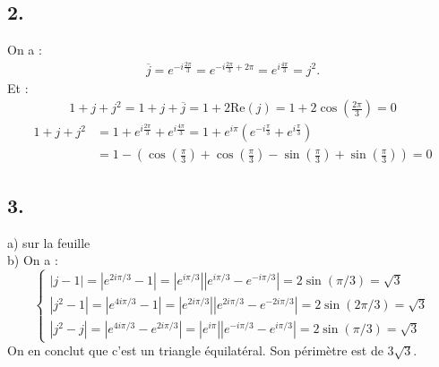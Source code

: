 \documentclass[10pt]{article}
\begin{document}
\subsection*{2.}
\begin{tcolorbox}[enhanced, width=7in, center, size=fbox, fontupper=\large, drop shadow southwest]
    On a :
    \begin{align*}
        \overline{j}=e^{-i\frac{2\pi}{3}}=e^{-i\frac{2\pi}{3}+2\pi}=e^{i\frac{4\pi}{3}}=j^2.
    \end{align*}
    Et :
    \begin{align*}
        1 + j + j^2 = 1 + j + \overline{j} = 1 + 2\text{Re}(j)=1+2\cos(\frac{2\pi}{3})=0
    \end{align*}
    \begin{align*}
        1 + j + j^2 &= 1 + e^{i\frac{2\pi}{3}} + e^{i\frac{4\pi}{3}}=1 + e^{i\pi}\left(e^{-i\frac{\pi}{3}} + e^{i\frac{\pi}{3}} \right)\\
        &= 1 - (\cos\left(\frac{\pi}{3}\right) + \cos\left(\frac{\pi}{3}\right) - \sin\left(\frac{\pi}{3}\right) + \sin\left(\frac{\pi}{3}\right))=0
    \end{align*}
\end{tcolorbox}

\subsection*{3.}
\begin{tcolorbox}[enhanced, width=7in, center, size=fbox, fontupper=\large, drop shadow southwest]
    a) sur la feuille\\
    b) On a :
    \begin{equation*}
        \begin{cases}
            |j-1|=|e^{2i\pi/3}-1|=|e^{i\pi/3}||e^{i\pi/3}-e^{-i\pi/3}|=2\sin(\pi/3)=\sqrt{3}\\
            |j^2-1|=|e^{4i\pi/3}-1|=|e^{2i\pi/3}||e^{2i\pi/3}-e^{-2i\pi/3}|=2\sin(2\pi/3)=\sqrt{3}\\
            |j^2-j|=|e^{4i\pi/3}-e^{2i\pi/3}|=|e^{i\pi}||e^{-i\pi/3}-e^{i\pi/3}|=2\sin(\pi/3)=\sqrt{3}
        \end{cases}
    \end{equation*}
    On en conclut que c'est un triangle équilatéral. Son périmètre est de $3\sqrt{3}$.
\end{tcolorbox}
\end{document}
